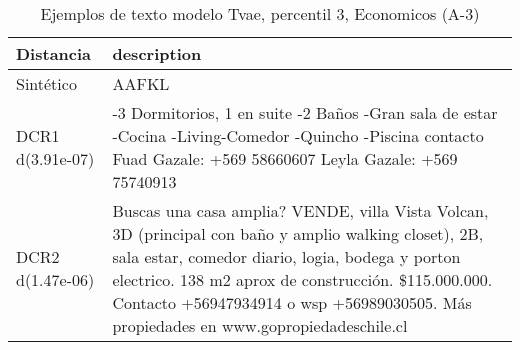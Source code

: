 \begin{table}[H]
\centering
\fontsize{10}{14}\selectfont
\caption{Ejemplos de texto modelo Tvae, percentil 3, Economicos (A-3)}
\label{table-example-economicos-a-3-tvae-3p-text}
\begin{tabular}{|l|m{35em}|}
\hline
\rowcolor[gray]{0.8}
Distancia & description \\
\hline Sintético & AAFKL \\
\hline DCR1 d(3.91e-07) & -3 Dormitorios, 1 en suite -2 Ba\~nos -Gran sala de estar -Cocina -Living-Comedor -Quincho -Piscina contacto Fuad Gazale: +569 58660607 Leyla Gazale: +569 75740913 \\
\hline DCR2 d(1.47e-06) & Buscas una casa amplia? VENDE, villa Vista Volcan, 3D (principal con ba\~no y amplio walking closet), 2B, sala estar, comedor diario, logia, bodega y porton electrico. 138 m2 aprox de construcci\'on. \$115.000.000. Contacto +56947934914 o wsp +56989030505. M\'as propiedades en www.gopropiedadeschile.cl \\
\hline
\end{tabular}
\end{table}
